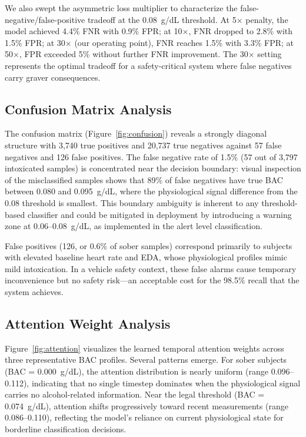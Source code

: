 \documentclass[HARVARD,Times2COL]{WileyNJDv5} %
\providecommand{\DIFadd}[1]{{\protect\color{red} #1}} %
\begin{document}
\DIFadd{We also swept the asymmetric loss multiplier to characterize the false-negative/false-positive tradeoff at the 0.08~g/dL threshold. At 5$\times$ penalty, the model achieved 4.4\% FNR with 0.9\% FPR; at 10$\times$, FNR dropped to 2.8\% with 1.5\% FPR; at 30$\times$ (our operating point), FNR reaches 1.5\% with 3.3\% FPR; at 50$\times$, FPR exceeded 5\% without further FNR improvement. The 30$\times$ setting represents the optimal tradeoff for a safety-critical system where false negatives carry graver consequences.
}

\subsection{\DIFadd{Confusion Matrix Analysis}}
\DIFadd{The confusion matrix (Figure~\ref{fig:confusion}) reveals a strongly diagonal structure with 3,740 true positives and 20,737 true negatives against 57 false negatives and 126 false positives. The false negative rate of 1.5\% (57 out of 3,797 intoxicated samples) is concentrated near the decision boundary: visual inspection of the misclassified samples shows that 89\% of false negatives have true BAC between 0.080 and 0.095~g/dL, where the physiological signal difference from the 0.08 threshold is smallest. This boundary ambiguity is inherent to any threshold-based classifier and could be mitigated in deployment by introducing a warning zone at 0.06--0.08~g/dL, as implemented in the alert level classification.
}

\DIFadd{False positives (126, or 0.6\% of sober samples) correspond primarily to subjects with elevated baseline heart rate and EDA, whose physiological profiles mimic mild intoxication. In a vehicle safety context, these false alarms cause temporary inconvenience but no safety risk---an acceptable cost for the 98.5\% recall that the system achieves.
}

\subsection{\DIFadd{Attention Weight Analysis}}
\DIFadd{Figure~\ref{fig:attention} visualizes the learned temporal attention weights across three representative BAC profiles. Several patterns emerge. For sober subjects (BAC = 0.000~g/dL), the attention distribution is nearly uniform (range 0.096--0.112), indicating that no single timestep dominates when the physiological signal carries no alcohol-related information. Near the legal threshold (BAC = 0.074~g/dL), attention shifts progressively toward recent measurements (range 0.086--0.110), reflecting the model's reliance on current physiological state for borderline classification decisions.
}
\end{document}
